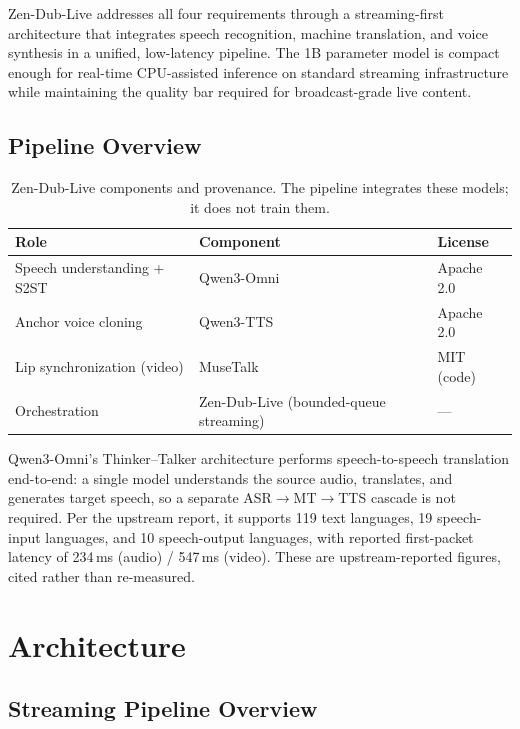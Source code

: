 \documentclass[11pt,a4paper]{article}
\begin{document}
Zen-Dub-Live addresses all four requirements through a streaming-first architecture that integrates speech recognition, machine translation, and voice synthesis in a unified, low-latency pipeline. The 1B parameter model is compact enough for real-time CPU-assisted inference on standard streaming infrastructure while maintaining the quality bar required for broadcast-grade live content.

\subsection{Pipeline Overview}

\begin{table}[H]
\centering
\caption{Zen-Dub-Live components and provenance. The pipeline integrates these models;
it does not train them.}
\begin{tabular}{lll}
\toprule
\textbf{Role} & \textbf{Component} & \textbf{License} \\
\midrule
Speech understanding + S2ST & Qwen3-Omni~\cite{qwen3omni} & Apache 2.0 \\
Anchor voice cloning & Qwen3-TTS~\cite{qwen3tts} & Apache 2.0 \\
Lip synchronization (video) & MuseTalk~\cite{musetalk} & MIT (code) \\
Orchestration & Zen-Dub-Live (bounded-queue streaming) & --- \\
\bottomrule
\end{tabular}
\end{table}

Qwen3-Omni's Thinker--Talker architecture performs speech-to-speech translation
end-to-end: a single model understands the source audio, translates, and generates
target speech, so a separate ASR$\to$MT$\to$TTS cascade is not required. Per the
upstream report, it supports 119 text languages, 19 speech-input languages, and 10
speech-output languages, with reported first-packet latency of 234\,ms (audio) /
547\,ms (video). These are upstream-reported figures, cited rather than re-measured.

\section{Architecture}

\subsection{Streaming Pipeline Overview}
\end{document}
